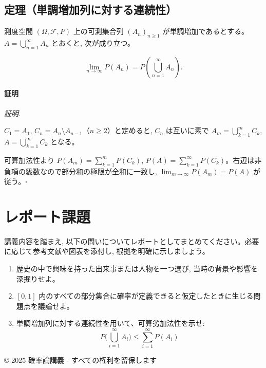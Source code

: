\documentclass[uplatex,dvipdfmx,11pt,a4paper,openany]{bxjsbook}
\begin{document}
\subsection{定理（単調増加列に対する連続性）}
測度空間 $(\Omega, \mathcal{F}, P)$ 上の可測集合列 $(A_n)_{n\ge 1}$ が単調増加であるとする。$A = \bigcup_{n=1}^{\infty} A_n$ とおくと, 次が成り立つ。

\[\lim_{n\to\infty} P(A_n) = P\!\left(\bigcup_{n=1}^{\infty} A_n\right).\]

\paragraph{証明}
\emph{証明.}

$C_1 = A_1$, $C_n = A_n \setminus A_{n-1}$（$n\ge 2$）と定めると, $C_n$ は互いに素で $A_m = \bigcup_{k=1}^{m} C_k$, $A = \bigcup_{k=1}^{\infty} C_k$ となる。

可算加法性より $P(A_m) = \sum_{k=1}^{m} P(C_k)$, $P(A) = \sum_{k=1}^{\infty} P(C_k)$。右辺は非負項の級数なので部分和の極限が全和に一致し, $\lim_{m\to\infty} P(A_m) = P(A)$ が従う。$\square$



\section{レポート課題}
講義内容を踏まえ, 以下の問いについてレポートとしてまとめてください。必要に応じて参考文献や図表を添付し, 根拠を明確に示しましょう。

\begin{enumerate}
\item 歴史の中で興味を持った出来事または人物を一つ選び, 当時の背景や影響を深掘りせよ。
\item $[0, 1]$ 内のすべての部分集合に確率が定義できると仮定したときに生じる問題点を議論せよ。
\item 単調増加列に対する連続性を用いて、可算劣加法性を示せ: \[P\bigl(\bigcup_{i=1}^{\infty} A_i\bigr) \le \sum_{i=1}^{\infty} P(A_i)\]
\end{enumerate}

© 2025 確率論講義 - すべての権利を留保します
\end{document}

